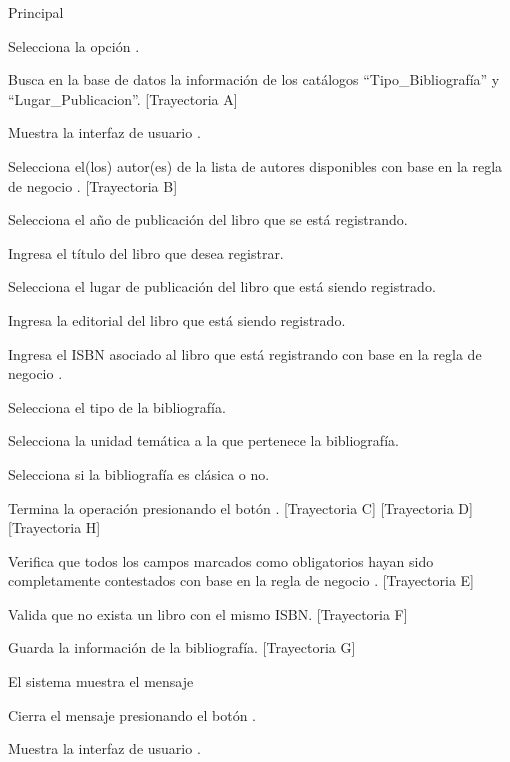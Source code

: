 \begin{UCtrayectoria}{Principal}

    \UCpaso[\UCactor] Selecciona la opción .

    \UCpaso Busca en la base de datos la información de los catálogos ``Tipo\_Bibliografía'' y ``Lugar\_Publicacion''. [Trayectoria A]

    \UCpaso Muestra la interfaz de usuario .

    \UCpaso[\UCactor] Selecciona el(los) autor(es) de la lista de autores disponibles con base en la regla de negocio . [Trayectoria B]
    
    \UCpaso[\UCactor] Selecciona el año de publicación del libro que se está registrando.
    
    \UCpaso[\UCactor] Ingresa el título del libro que desea registrar.
    
    \UCpaso[\UCactor] Selecciona el lugar de publicación del libro que está siendo registrado.
    
    \UCpaso[\UCactor] Ingresa la editorial del libro que está siendo registrado.

    \UCpaso[\UCactor] Ingresa el ISBN asociado al libro que está registrando con base en la regla de negocio .

    \UCpaso[\UCactor] Selecciona el tipo de la bibliografía.
    
    \UCpaso[\UCactor] Selecciona la unidad temática a la que pertenece la bibliografía.

    \UCpaso[\UCactor] Selecciona si la bibliografía es clásica o no.
    
    \UCpaso[\UCactor] Termina la operación presionando el botón . [Trayectoria C] [Trayectoria D] [Trayectoria H]

    \UCpaso Verifica que todos los campos marcados como obligatorios hayan sido completamente contestados con base en la regla de negocio . [Trayectoria E]

    \UCpaso Valida que no exista un libro con el mismo ISBN. [Trayectoria F]

    \UCpaso Guarda la información de la bibliografía. [Trayectoria G]

    \UCpaso El sistema muestra el mensaje 

    \UCpaso[\UCactor] Cierra el mensaje presionando el botón .

    \UCpaso Muestra la interfaz de usuario .
\end{UCtrayectoria}

